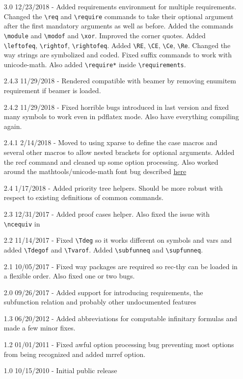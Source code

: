 \documentclass[leqno,11pt]{amsart}
\begin{document}
\begin{itemize}
	\item[3.0] 12/23/2018 - Added requirements environment for multiple requirements.  Changed the \verb=\req= and \verb=\require= commands to take their optional argument after the first mandatory arguments as well as before.  Added the commands \verb=\module= and \verb=\modof= and \verb=\xor=.  Improved the corner quotes. Added \verb=\leftofeq=, \verb=\rightof=, \verb=\rightofeq=.  Added \verb=\RE=, \verb=\CE=, \verb=\Ce=, \verb=\Re=.  Changed the way strings are symbolized and coded.  Fixed suffix commands to work with unicode-math.  Also added \verb=\require*= inside \verb=\requirements=. 
	\item[2.4.3] 11/29/2018 - Rendered compatible with beamer by removing enumitem requirement if beamer is loaded.
	\item[2.4.2] 11/29/2018 - Fixed horrible bugs introduced in last version and fixed many symbols to work even in pdflatex mode.  Also have everything compiling again.
	\item[2.4.1] 2/14/2018 - Moved to using xparse to define the case macros and several other macros to allow nested brackets for optional arguments.  Added the recf command and cleaned up some option processing.  Also worked around the mathtools/unicode-math font bug described \href{https://tex.stackexchange.com/questions/335164/incompatibility-with-mathtools-and-unicode-math-in-xelatex/335177}{here}
	\item[2.4] 1/17/2018 - Added priority tree helpers.  Should be more robust with respect to existing definitions of common commands.
	\item[2.3] 12/31/2017 - Added proof cases helper.  Also fixed the issue with \verb=\ncequiv= in \XeLaTeX
	\item[2.2] 11/14/2017 - Fixed \verb=\Tdeg= so it works different on symbols and vars and added \verb=\Tdegof= and \verb=\Tvarof=.  Added \verb=\subfunneq= and \verb=\supfunneq=.
	\item[2.1] 10/05/2017 - Fixed way packages are required so rec-thy can be loaded in a flexible order.  Also fixed one or two bugs.
	\item[2.0] 09/26/2017 - Added support for introducing requirements, the subfunction relation and probably other undocumented features
	\item[1.3] 06/20/2012 - Added abbreviations for computable infinitary formulas and made a few minor fixes.
	\item[1.2] 01/01/2011 - Fixed awful option processing bug preventing most options from being recognized and added mrref option.
	\item[1.0] 10/15/2010 - Initial public release
\end{itemize}
\end{document}
